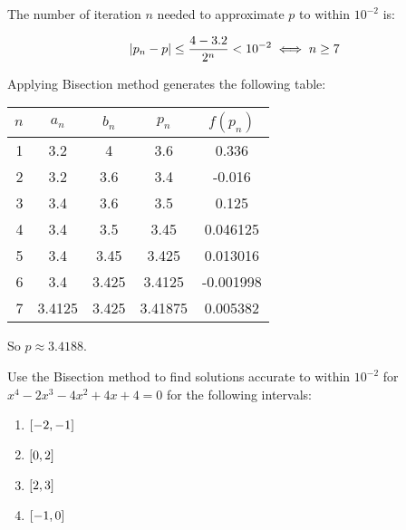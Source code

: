 \documentclass[../../Assignments.tex]{subfiles}
\begin{document}
\begin{solution}
\begin{enumerate}[label = (\alph*)]
            The number of iteration \(n\) needed to approximate \(p\) to within
            \(10^{-2}\) is:

            \[\abs{p_n - p} \leq \frac{4 - \num{3.2}}{2^n} < 10^{-2} \iff n \geq 7\]

            Applying Bisection method generates the following table:

            \begin{table}[H]
                \centering
                \begin{tabular}{r S[table-format=1.5] S[table-format=1.6] S[table-format=1.6] S[table-format=-1.6]}
                    \toprule
                    \(n\)  &  {\(a_n\)}  &  {\(b_n\)}  &  {\(p_n\)}  &  {\(f(p_n)\)}  \\
                      &  3.2        &  4          &  3.6        &   0.336        \\
                        2  &  3.2        &  3.6        &  3.4        &  -0.016        \\
                        3  &  3.4        &  3.6        &  3.5        &   0.125        \\
                        4  &  3.4        &  3.5        &  3.45       &   0.046125     \\
                        5  &  3.4        &  3.45       &  3.425      &   0.013016     \\
                        6  &  3.4        &  3.425      &  3.4125     &  -0.001998     \\
                        7  &  3.4125     &  3.425      &  3.41875    &   0.005382     \\
                    \bottomrule
                \end{tabular}
            \end{table}

            So \(p \approx \num{3.4188}\).
    \end{enumerate}
\end{solution}

\begin{exercise}
    Use the Bisection method to find solutions accurate to within \(10^{-2}\)
    for \(x^4 - 2x^3 - 4x^2 + 4x + 4 = 0\) for the following intervals:

    \begin{multicols}{4}
        \begin{enumerate}[label = (\alph*)]
            \item \(\interval{-2}{-1}\)
            \item \(\interval{0}{2}\)
            \item \(\interval{2}{3}\)
            \item \(\interval{-1}{0}\)
        \end{enumerate}
    \end{multicols}
\end{exercise}
\end{document}
